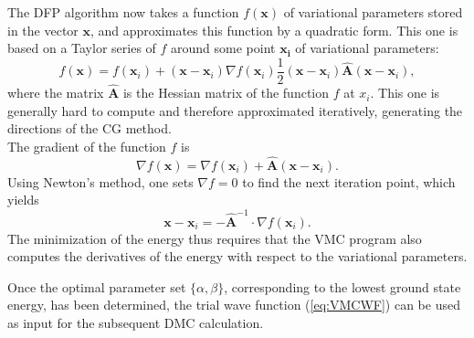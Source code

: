The DFP algorithm now takes a function $f(\mathbf{x})$ of variational parameters stored in the vector $\mathbf{x}$, and approximates this function by a quadratic form. This one is based on a Taylor series of $f$ around some point $\mathbf{x_i}$ of variational parameters: 
\[
f(\mathbf{x}) = f(\mathbf{x}_i) + (\mathbf{x}-\mathbf{x}_i)\nabla f(\mathbf{x}_i)\frac{1}{2}(\mathbf{x}-\mathbf{x}_i) \mathbf{\hat{A}} (\mathbf{x}-\mathbf{x}_i),
\]
where the matrix 
$\mathbf{\hat A}$ is the Hessian matrix of the function $f$ at $x_i$. This one is generally hard to compute and therefore approximated iteratively, generating the directions of the CG method.\\
The gradient of the function $f$ is
\[
\nabla f(\mathbf{x}) = \nabla f(\mathbf{x}_i) + \mathbf{\hat{A}}(\mathbf{x}-\mathbf{x}_i).
\]
Using Newton's method, one sets $\nabla f = 0$ to find the next iteration point, which yields
\[
\mathbf{x} - \mathbf{x}_i = - \mathbf{\hat{A}}^{-1} \cdot \nabla f(\mathbf{x}_i).
\]
The minimization of the energy thus requires that the VMC program also computes the derivatives of the energy with respect to the variational parameters.


Once the optimal parameter set $\lbrace \alpha,\beta\rbrace$, corresponding to the lowest ground state energy, has been determined, the trial wave function (\ref{eq:VMCWF}) can be used as input for the subsequent DMC calculation.

